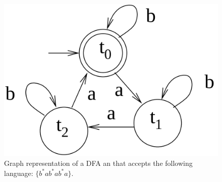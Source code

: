 \begin{figure}
\begin{center}
  \includegraphics[scale=0.17]{./images/CA_FDM/amod3Automata}
  \caption[Graph representation of a DFA.]{Graph representation of a DFA an that accepts the following language: $\{b^*ab^*ab^*a\}$.}
  \label{amod3Automata}
\end{center}
\end{figure}



